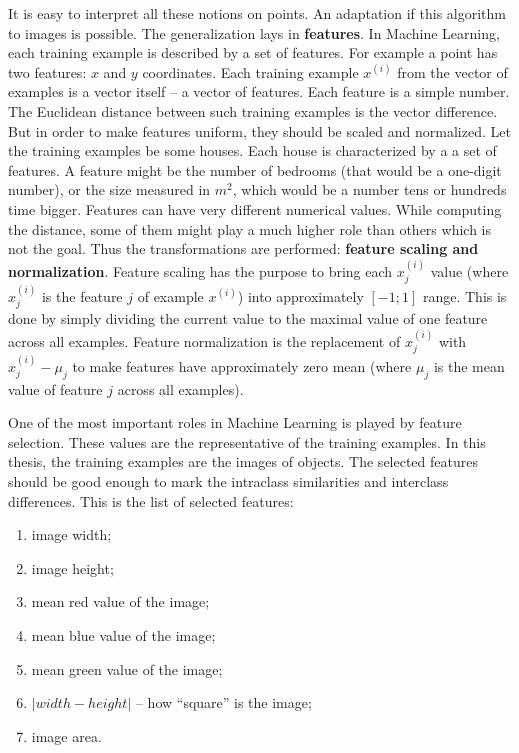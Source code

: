       It is easy to interpret all these notions on points. An adaptation if this algorithm to images is possible. The generalization lays in \textbf{features}. In Machine Learning, each training example is described by a set of features. For example a point has two features: \( x \) and \( y \) coordinates. Each training example \( x^{(i)} \) from the vector of examples is a vector itself -- a vector of features. Each feature is a simple number. The Euclidean distance between such training examples is the vector difference. But in order to make features uniform, they should be scaled and normalized. Let the training examples be some houses. Each house is characterized by a a set of features. A feature might be the number of bedrooms (that would be a one-digit number), or the size measured in \( m^2 \), which would be a number tens or hundreds time bigger. Features can have very different numerical values. While computing the distance, some of them might play a much higher role than others which is not the goal. Thus the transformations are performed: \textbf{feature scaling and normalization}.
      Feature scaling has the purpose to bring each \( x^{(i)}_j \) value (where \( x^{(i)}_j \) is the feature \( j \) of example \( x^{(i)} \)) into approximately \( [-1;1] \) range. This is done by simply dividing the current value to the maximal value of one feature across all examples. Feature normalization is the replacement of \( x^{(i)}_j \) with \( x^{(i)}_j - \mu_j \) to make features have approximately zero mean (where \( \mu_j \) is the mean value of feature \( j \) across all examples). 

      One of the most important roles in Machine Learning is played by feature selection. These values are the representative of the training examples. In this thesis, the training examples are the images of objects. The selected features should be good enough to mark the intraclass similarities and interclass differences. This is the list of selected features:
      \begin{enumerate}[topsep=0pt, partopsep=0pt,itemsep=0pt,parsep=1pt]
        \item image width;
        \item image height;
        \item mean red value of the image;
        \item mean blue value of the image;
        \item mean green value of the image;
        \item \( |width - height| \) -- how ``square'' is the image;
        \item image area.
      \end{enumerate}

